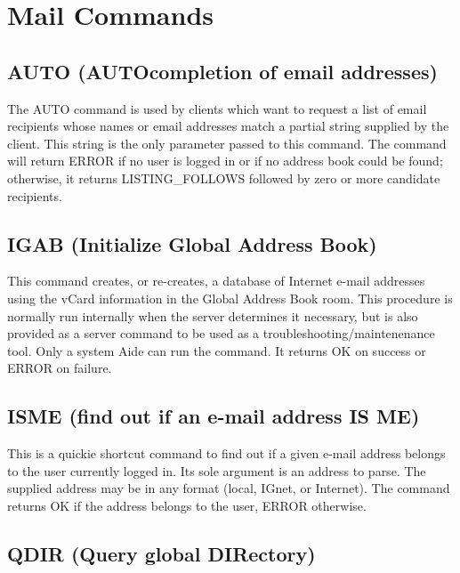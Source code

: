 \section{Mail Commands}



\subsection{AUTO (AUTOcompletion of email addresses)}

 The AUTO command is used by clients which want to request a list of email
recipients whose names or email addresses match a partial string supplied by
the client.  This string is the only parameter passed to this command.  The
command will return ERROR if no user is logged in or if no address book could
be found; otherwise, it returns LISTING_FOLLOWS followed by zero or more
candidate recipients.



\subsection{IGAB (Initialize Global Address Book)}

 This command creates, or re-creates, a database of Internet e-mail addresses
using the vCard information in the Global Address Book room.  This procedure
is normally run internally when the server determines it necessary, but is
also provided as a server command to be used as a troubleshooting/maintenenance
tool.  Only a system Aide can run the command.  It returns OK on success or
ERROR on failure.



\subsection{ISME (find out if an e-mail address IS ME)}

 This is a quickie shortcut command to find out if a given e-mail address
belongs to the user currently logged in.  Its sole argument is an address to
parse.  The supplied address may be in any format (local, IGnet, or Internet).
The command returns OK if the address belongs to the user, ERROR otherwise.



\subsection{QDIR (Query global DIRectory)}

